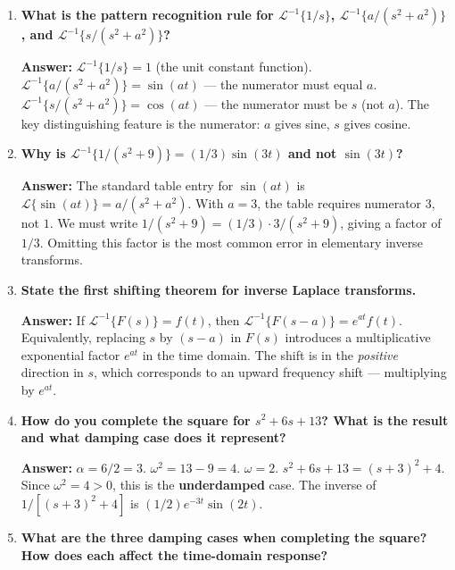 \documentclass[12pt,a4paper]{article}
\begin{document}
\begin{enumerate}[leftmargin=*, label=\textbf{Q\arabic*.}]

\item \textbf{What is the pattern recognition rule for $\mathcal{L}^{-1}\{1/s\}$,
      $\mathcal{L}^{-1}\{a/(s^2+a^2)\}$, and $\mathcal{L}^{-1}\{s/(s^2+a^2)\}$?}

\textbf{Answer:}
$\mathcal{L}^{-1}\{1/s\} = 1$ (the unit constant function).
$\mathcal{L}^{-1}\{a/(s^2+a^2)\} = \sin(at)$ --- the numerator must equal $a$.
$\mathcal{L}^{-1}\{s/(s^2+a^2)\} = \cos(at)$ --- the numerator must be $s$ (not $a$).
The key distinguishing feature is the numerator: $a$ gives sine, $s$ gives cosine.

\item \textbf{Why is $\mathcal{L}^{-1}\{1/(s^2+9)\} = (1/3)\sin(3t)$ and not $\sin(3t)$?}

\textbf{Answer:}
The standard table entry for $\sin(at)$ is $\mathcal{L}\{\sin(at)\} = a/(s^2+a^2)$.
With $a = 3$, the table requires numerator $3$, not $1$.
We must write $1/(s^2+9) = (1/3)\cdot 3/(s^2+9)$, giving a factor of $1/3$.
Omitting this factor is the most common error in elementary inverse transforms.

\item \textbf{State the first shifting theorem for inverse Laplace transforms.}

\textbf{Answer:}
If $\mathcal{L}^{-1}\{F(s)\} = f(t)$, then $\mathcal{L}^{-1}\{F(s-a)\} = e^{at}f(t)$.
Equivalently, replacing $s$ by $(s-a)$ in $F(s)$ introduces a multiplicative exponential
factor $e^{at}$ in the time domain. The shift is in the \emph{positive} direction in $s$,
which corresponds to an upward frequency shift --- multiplying by $e^{at}$.

\item \textbf{How do you complete the square for $s^2 + 6s + 13$?
      What is the result and what damping case does it represent?}

\textbf{Answer:}
$\alpha = 6/2 = 3$. $\omega^2 = 13 - 9 = 4$. $\omega = 2$.
$s^2 + 6s + 13 = (s+3)^2 + 4$.
Since $\omega^2 = 4 > 0$, this is the \textbf{underdamped} case.
The inverse of $1/[(s+3)^2+4]$ is $(1/2)e^{-3t}\sin(2t)$.

\item \textbf{What are the three damping cases when completing the square?
      How does each affect the time-domain response?}


\end{enumerate}
\end{document}
